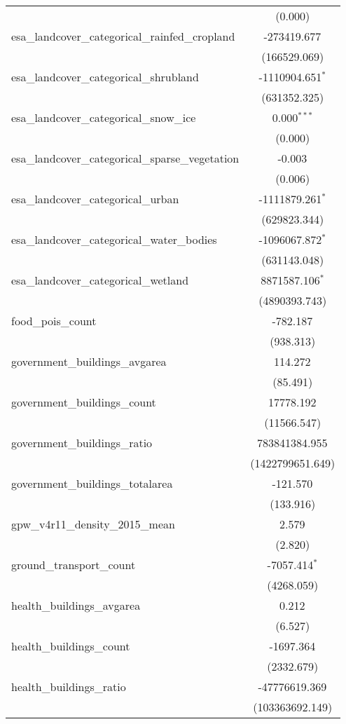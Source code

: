 \begin{table}[!htbp]
\begin{tabular}{@{\extracolsep{5pt}}lc}
  & (0.000) \\
 esa_landcover_categorical_rainfed_cropland & -273419.677$^{}$ \\
  & (166529.069) \\
 esa_landcover_categorical_shrubland & -1110904.651$^{*}$ \\
  & (631352.325) \\
 esa_landcover_categorical_snow_ice & 0.000$^{***}$ \\
  & (0.000) \\
 esa_landcover_categorical_sparse_vegetation & -0.003$^{}$ \\
  & (0.006) \\
 esa_landcover_categorical_urban & -1111879.261$^{*}$ \\
  & (629823.344) \\
 esa_landcover_categorical_water_bodies & -1096067.872$^{*}$ \\
  & (631143.048) \\
 esa_landcover_categorical_wetland & 8871587.106$^{*}$ \\
  & (4890393.743) \\
 food_pois_count & -782.187$^{}$ \\
  & (938.313) \\
 government_buildings_avgarea & 114.272$^{}$ \\
  & (85.491) \\
 government_buildings_count & 17778.192$^{}$ \\
  & (11566.547) \\
 government_buildings_ratio & 783841384.955$^{}$ \\
  & (1422799651.649) \\
 government_buildings_totalarea & -121.570$^{}$ \\
  & (133.916) \\
 gpw_v4r11_density_2015_mean & 2.579$^{}$ \\
  & (2.820) \\
 ground_transport_count & -7057.414$^{*}$ \\
  & (4268.059) \\
 health_buildings_avgarea & 0.212$^{}$ \\
  & (6.527) \\
 health_buildings_count & -1697.364$^{}$ \\
  & (2332.679) \\
 health_buildings_ratio & -47776619.369$^{}$ \\
  & (103363692.149) \\

\end{tabular}
\end{table}
